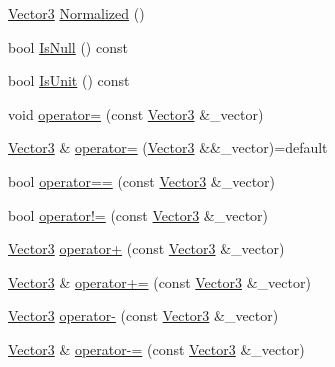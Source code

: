 \begin{DoxyCompactItemize}
\item 
\mbox{\hyperlink{structpad_1_1math_1_1_vector3}{Vector3}} \mbox{\hyperlink{structpad_1_1math_1_1_vector3_a1eeab221ba8b7ea8d0a7d1da8b404037}{Normalized}} ()
\item 
bool \mbox{\hyperlink{structpad_1_1math_1_1_vector3_a47a83130cf6e4210a5a3d7f8ac7bb70a}{Is\+Null}} () const
\item 
bool \mbox{\hyperlink{structpad_1_1math_1_1_vector3_ab8816c85165ed684cb521f3647dff935}{Is\+Unit}} () const
\item 
void \mbox{\hyperlink{structpad_1_1math_1_1_vector3_aabaa38eda86b1ebc0ad7b10ce3dd146e}{operator=}} (const \mbox{\hyperlink{structpad_1_1math_1_1_vector3}{Vector3}} \&\+\_\+vector)
\item 
\mbox{\hyperlink{structpad_1_1math_1_1_vector3}{Vector3}} \& \mbox{\hyperlink{structpad_1_1math_1_1_vector3_af89a8db6bdfd4ce06a96e63021e9ed9a}{operator=}} (\mbox{\hyperlink{structpad_1_1math_1_1_vector3}{Vector3}} \&\&\+\_\+vector)=default
\item 
bool \mbox{\hyperlink{structpad_1_1math_1_1_vector3_a8366aa2e0deb2f3581c9aa8e9d8838f6}{operator==}} (const \mbox{\hyperlink{structpad_1_1math_1_1_vector3}{Vector3}} \&\+\_\+vector)
\item 
bool \mbox{\hyperlink{structpad_1_1math_1_1_vector3_a3f24df3c362f90ca6a02bfb40ccd6882}{operator!=}} (const \mbox{\hyperlink{structpad_1_1math_1_1_vector3}{Vector3}} \&\+\_\+vector)
\item 
\mbox{\hyperlink{structpad_1_1math_1_1_vector3}{Vector3}} \mbox{\hyperlink{structpad_1_1math_1_1_vector3_a63632a298e724533cac1011dacff74b3}{operator+}} (const \mbox{\hyperlink{structpad_1_1math_1_1_vector3}{Vector3}} \&\+\_\+vector)
\item 
\mbox{\hyperlink{structpad_1_1math_1_1_vector3}{Vector3}} \& \mbox{\hyperlink{structpad_1_1math_1_1_vector3_a250f7ccf1fd5f387dd8292c224b08c9e}{operator+=}} (const \mbox{\hyperlink{structpad_1_1math_1_1_vector3}{Vector3}} \&\+\_\+vector)
\item 
\mbox{\hyperlink{structpad_1_1math_1_1_vector3}{Vector3}} \mbox{\hyperlink{structpad_1_1math_1_1_vector3_acce2697e7151ebb1c15840eb36535e12}{operator-\/}} (const \mbox{\hyperlink{structpad_1_1math_1_1_vector3}{Vector3}} \&\+\_\+vector)
\item 
\mbox{\hyperlink{structpad_1_1math_1_1_vector3}{Vector3}} \& \mbox{\hyperlink{structpad_1_1math_1_1_vector3_abc2512b1a4d062e231d32c6de4a19d3e}{operator-\/=}} (const \mbox{\hyperlink{structpad_1_1math_1_1_vector3}{Vector3}} \&\+\_\+vector)

\end{DoxyCompactItemize}
